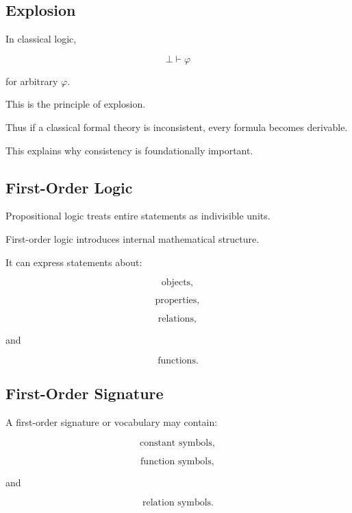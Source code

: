\subsection{Explosion}
\label{subsec:principle-explosion}

In classical logic,

\[
\boxed{
\bot
\vdash
\varphi
}
\]

for arbitrary \(\varphi\).

This is the principle of explosion.

Thus if a classical formal theory is inconsistent, every formula becomes
derivable.

This explains why consistency is foundationally important.

\subsection{First-Order Logic}
\label{subsec:first-order-logic-introduction}

Propositional logic treats entire statements as indivisible units.

First-order logic introduces internal mathematical structure.

It can express statements about:

\[
\boxed{
\text{objects},
}
\]

\[
\boxed{
\text{properties},
}
\]

\[
\boxed{
\text{relations},
}
\]

and

\[
\boxed{
\text{functions}.
}
\]

\subsection{First-Order Signature}
\label{subsec:first-order-signature}

A first-order signature or vocabulary may contain:

\[
\boxed{
\text{constant symbols},
}
\]

\[
\boxed{
\text{function symbols},
}
\]

and

\[
\boxed{
\text{relation symbols}.
}
\]

